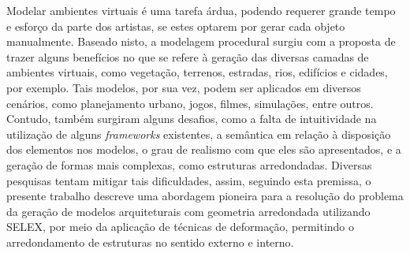 Modelar ambientes virtuais é uma tarefa árdua, podendo requerer grande tempo e esforço da parte dos artistas, se estes optarem por gerar cada objeto manualmente. Baseado nisto, a modelagem procedural surgiu com a proposta de trazer alguns benefícios no que se refere à geração das diversas camadas de ambientes virtuais, como vegetação, terrenos, estradas, rios, edifícios e cidades, por exemplo. Tais modelos, por sua vez, podem ser aplicados em diversos cenários, como planejamento urbano, jogos, filmes, simulações, entre outros. Contudo, também surgiram alguns desafios, como a falta de intuitividade na utilização de alguns \textit{frameworks} existentes, a semântica em relação à disposição dos elementos nos modelos, o grau de realismo com que eles são apresentados, e a geração de formas mais complexas, como estruturas arredondadas. Diversas pesquisas tentam mitigar tais dificuldades, assim, seguindo esta premissa, o presente trabalho descreve uma abordagem pioneira para a resolução do problema da geração de modelos arquiteturais com geometria arredondada utilizando \gls{SELEX}, por meio da aplicação de técnicas de deformação, permitindo o arredondamento de estruturas no sentido externo e interno.

